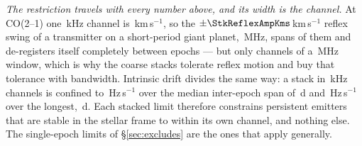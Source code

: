 \emph{The restriction travels with every number above, and its width is the
channel.} At CO(2--1) one
\StkRefChanKHz\,kHz channel is \StkTolFineKms\,km\,s$^{-1}$, so the
$\pm\StkReflexAmpKms$\,km\,s$^{-1}$ reflex swing of a transmitter on a
short-period giant planet, \StkReflexMHz\,MHz, spans \StkReflexChan{} of
them and de-registers itself completely between epochs --- but only
\StkReflexChanCoarse{} channels of a \ChanBModeMHz\,MHz window, which is why
the coarse stacks tolerate reflex motion and buy that tolerance with
bandwidth. Intrinsic drift divides the same way: a stack in
\StkRefChanKHz\,kHz channels is confined to \StkDriftTolHzS\,Hz\,s$^{-1}$
over the median inter-epoch span of \StkSpanMedD\,d and
\StkDriftTolTightHzS\,Hz\,s$^{-1}$ over the longest, \StkSpanMaxD\,d. Each
stacked limit therefore constrains persistent emitters that are stable in
the stellar frame to within its own channel, and nothing else. The
single-epoch limits of \S\ref{sec:excludes} are the ones that apply
generally.
